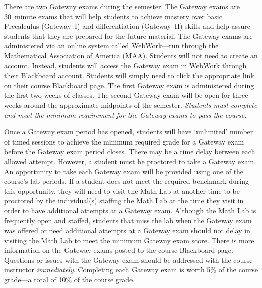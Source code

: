 \documentclass[11pt,letterpaper]{article}
\begin{document}
\newpage






There are two Gateway exams during the semester. The Gateway exams are 30~minute exams that will help students to achieve mastery over basic Precalculus (Gateway~I) and differentiation (Gateway~II) skills and help assure students that they are prepared for the future material. The Gateway exams are administered via an online system called WebWork---run through the Mathematical Association of America (MAA). Students will not need to create an account. Instead, students will access the Gateway exam in WebWork through their Blackboard account. Students will simply need to click the appropriate link on their course Blackboard page. The first Gateway exam is administered during the first two weeks of classes. The second Gateway exam will be open for three weeks around the approximate midpoints of the semester. {\itshape Students must complete and meet the minimum requirement for the Gateway exams to pass the course.} \pspace


Once a Gateway exam period has opened, students will have `unlimited' number of timed sessions to achieve the minimum required grade for a Gateway exam before the Gateway exam period closes. There may be a time delay between each allowed attempt. However, a student must be proctored to take a Gateway exam. An opportunity to take each Gateway exam will be provided using one of the course's lab periods. If a student does not meet the required benchmark during this opportunity, they will need to visit the Math Lab at another time to be proctored by the individual(s) staffing the Math Lab at the time they visit in order to have additional attempts at a Gateway exam. Although the Math Lab is frequently open and staffed, students that miss the lab when the Gateway exam was offered or need additional attempts at a Gateway exam should not delay in visiting the Math Lab to meet the minimum Gateway exam score. There is more information on the Gateway exams posted to the course Blackboard page. Questions or issues with the Gateway exam should be addressed with the course instructor \textit{immediately}. Completing each Gateway exam is worth 5\% of the course grade---a total of 10\% of the course grade. 
\sectionbreak



\end{document}

